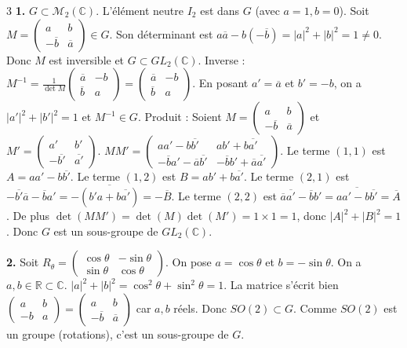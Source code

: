 \begin{correction}{3}
\textbf{1.} $G \subset \mathcal{M}_{2}(\mathbb{C})$. L'élément neutre $I_2$ est dans $G$ (avec $a=1, b=0$).
Soit $M = \begin{pmatrix}a&b\\ -\overline{b}&\overline{a}\end{pmatrix} \in G$. Son déterminant est $a\overline{a} - b(-\overline{b}) = |a|^2 + |b|^2 = 1 \neq 0$. Donc $M$ est inversible et $G \subset GL_2(\mathbb{C})$.
Inverse : $M^{-1} = \frac{1}{\det M} \begin{pmatrix}\overline{a}&-b\\ \overline{b}&a\end{pmatrix} = \begin{pmatrix}\overline{a}&-b\\ \overline{b}&a\end{pmatrix}$. En posant $a'=\overline{a}$ et $b'=-b$, on a $|a'|^2+|b'|^2=1$ et $M^{-1} \in G$.
Produit : Soient $M = \begin{pmatrix}a&b\\ -\overline{b}&\overline{a}\end{pmatrix}$ et $M' = \begin{pmatrix}a'&b'\\ -\overline{b'}&\overline{a'}\end{pmatrix}$.
$M M' = \begin{pmatrix} aa' - b\overline{b'} & ab' + b\overline{a'} \\ -\overline{b}a' - \overline{a}\overline{b'} & -\overline{b}b' + \overline{a}\overline{a'} \end{pmatrix}$.
Le terme $(1,1)$ est $A = aa' - b\overline{b'}$. Le terme $(1,2)$ est $B = ab' + b\overline{a'}$.
Le terme $(2,1)$ est $-\overline{b'} \overline{a} - \overline{b} a' = -\overline{(b'a + b\overline{a'})} = -\overline{B}$.
Le terme $(2,2)$ est $\overline{a}\overline{a'} - \overline{b}b' = \overline{aa' - b\overline{b'}} = \overline{A}$.
De plus $\det(MM') = \det(M)\det(M') = 1 \times 1 = 1$, donc $|A|^2+|B|^2=1$.
Donc $G$ est un sous-groupe de $GL_2(\mathbb{C})$.

\textbf{2.} Soit $R_\theta = \begin{pmatrix}\cos\theta&-\sin\theta\\ \sin\theta&\cos\theta\end{pmatrix}$.
On pose $a=\cos\theta$ et $b=-\sin\theta$. On a $a,b \in \mathbb{R} \subset \mathbb{C}$.
$|a|^2+|b|^2 = \cos^2\theta + \sin^2\theta = 1$.
La matrice s'écrit bien $\begin{pmatrix}a&b\\ -b&a\end{pmatrix} = \begin{pmatrix}a&b\\ -\overline{b}&\overline{a}\end{pmatrix}$ car $a,b$ réels.
Donc $SO(2) \subset G$. Comme $SO(2)$ est un groupe (rotations), c'est un sous-groupe de $G$.
\end{correction}

